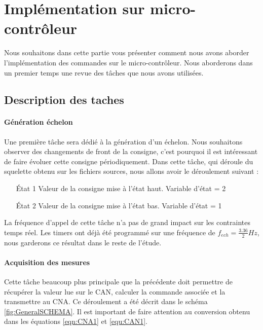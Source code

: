 \section{Implémentation sur micro-contrôleur}	
Nous souhaitons dans cette partie vous présenter comment nous avons aborder l'implémentation des commandes sur le micro-contrôleur. Nous aborderons dans un premier temps une revue des tâches que nous avons utilisées. 
		\subsection{Description des taches}
		\paragraph*{Génération échelon}
		Une première tâche sera dédié à la génération d'un échelon. Nous souhaitons observer des changements de front de la consigne, c'est pourquoi il est intéressant de faire évoluer cette consigne périodiquement. Dans cette tâche, qui déroule du squelette obtenu sur les fichiers sources, nous allons avoir le déroulement suivant : \begin{itemize}
		\item[État 1] Valeur de la consigne mise à l'état haut. Variable d'état = 2
		\item[État 2] Valeur de la consigne mise à l'état bas. Variable d'état = 1
\end{itemize}
La fréquence d'appel de cette tâche n'a pas de grand impact sur les contraintes temps réel. Les timers ont déjà été programmé sur une fréquence de $f_{ech} = \frac{3.36}{2}Hz$, nous garderons ce résultat dans le reste de l'étude.		 
\paragraph{Acquisition des mesures}		 
		Cette tâche beaucoup plus principale que la précédente doit permettre de récupérer la valeur lue sur le CAN, calculer la commande associée et la transmettre au CNA. Ce déroulement a été décrit dans le schéma \ref{fig:GeneralSCHEMA}. Il est important de faire attention au conversion obtenu dans les équations \ref{eqn:CNA1} et \ref{equ:CAN1}.
